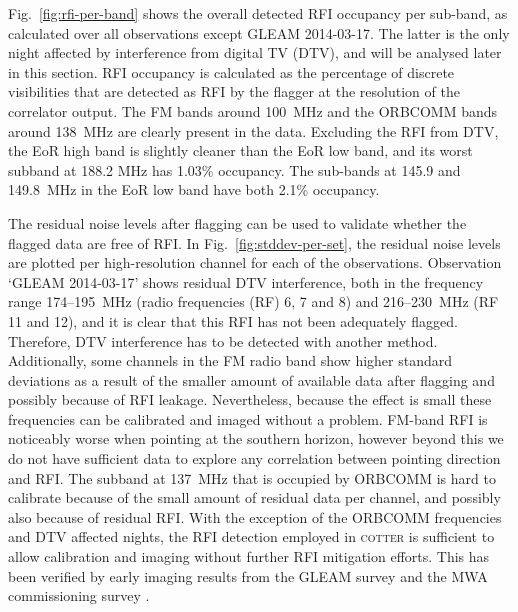 \documentclass{pasa}
\begin{document}
Fig.~\ref{fig:rfi-per-band} shows the overall detected RFI occupancy per sub-band, as calculated over all observations except GLEAM 2014-03-17. The latter is the only night affected by interference from digital TV (DTV), and will be analysed later in this section. RFI occupancy is calculated as the percentage of discrete visibilities that are detected as RFI by the flagger at the resolution of the correlator output. The FM bands around 100~MHz and the ORBCOMM bands around 138~MHz are clearly present in the data. Excluding the RFI from DTV, the EoR high band is slightly cleaner than the EoR low band, and its worst subband at 188.2 MHz has 1.03\% occupancy. The sub-bands at 145.9 and 149.8~MHz in the EoR low band have both 2.1\% occupancy.

The residual noise levels after flagging can be used to validate whether the flagged data are free of RFI. In Fig.~\ref{fig:stddev-per-set}, the residual noise levels are plotted per high-resolution channel for each of the observations. Observation `GLEAM 2014-03-17' shows residual DTV interference, both in the frequency range 174--195~MHz (radio frequencies (RF) 6, 7 and 8) and 216--230~MHz (RF 11 and 12), and it is clear that this RFI has not been adequately flagged. Therefore, DTV interference has to be detected with another method. Additionally, some channels in the FM radio band show higher standard deviations as a result of the smaller amount of available data after flagging and possibly because of RFI leakage. Nevertheless, because the effect is small these frequencies can be calibrated and imaged without a problem. FM-band RFI is noticeably worse when pointing at the southern horizon, however beyond this we do not have sufficient data to explore any correlation between pointing direction and RFI. The subband at 137~MHz that is occupied by ORBCOMM is hard to calibrate because of the small amount of residual data per channel, and possibly also because of residual RFI. With the exception of the ORBCOMM frequencies and DTV affected nights, the RFI detection employed in \textsc{cotter} is sufficient to allow calibration and imaging without further RFI mitigation efforts. This has been verified by early imaging results from the GLEAM survey and the MWA commissioning survey \citep{hindson-cluster-emission-2014, hurley-walker-mwacs-2014, murphy-mwa-exoplanets-2014}.
\end{document}
